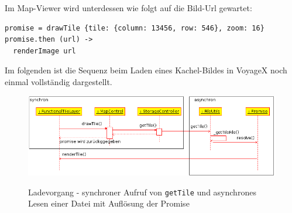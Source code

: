 \enlargethispage{3\baselineskip} %
Im Map-Viewer wird unterdessen wie folgt auf die Bild-Url gewartet:
\lstset{language=CoffeeScript}
\begin{lstlisting}[frame=single,numbers=none,xleftmargin=0pt]
promise = drawTile {tile: {column: 13456, row: 546}, zoom: 16}
promise.then (url) ->
  renderImage url
\end{lstlisting}
\vspace{2ex}
Im folgenden ist die Sequenz beim Laden eines Kachel-Bildes in VoyageX noch einmal vollständig dargestellt. %
  \begin{figure}[H]
      \centering
	  \includegraphics[scale=0.7]{bilder/uml/loadTile.png}\\ 
  	  \caption{Ladevorgang - synchroner Aufruf von \texttt{getTile} und asynchrones Lesen einer Datei mit Auflösung der Promise}
  \end{figure}
